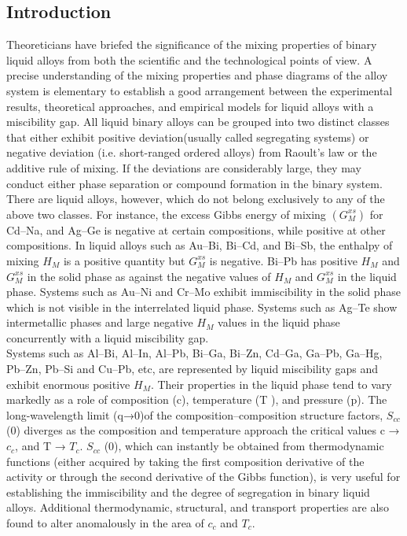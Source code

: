 \documentclass[12pt]{article}
\newcommand*{\1}{\hspace{1pt}}
\begin{document}
    \subsection*{Introduction}
    Theoreticians have briefed the significance of the mixing properties of binary liquid alloys 
    from both the scientific and the technological points of view. A precise understanding of 
    the mixing properties and phase diagrams of the alloy system is elementary to establish a 
    good arrangement between the experimental results, theoretical approaches, and empirical 
    models for liquid alloys with a miscibility gap.
    All liquid binary alloys can be grouped into two distinct classes that either exhibit 
    positive deviation(usually called segregating systems) or negative deviation (i.e. 
    short-ranged ordered alloys) from Raoult's law or the additive rule of mixing. If the 
    deviations are considerably large, they may conduct either phase separation or compound 
    formation in the binary system. \\

        There are liquid alloys, however, which do not belong exclusively to any of the above 
    two classes. For instance, the excess Gibbs energy of mixing $(G ^{xs} _{M} )$ for Cd–Na, and 
    Ag–Ge is negative at certain compositions, while positive at other compositions. In 
    liquid alloys such as Au–Bi, Bi–Cd, and Bi–Sb, the enthalpy of mixing $H_{M}$ is a 
    positive quantity but $G^{xs} _{M}$  is negative. Bi–Pb has positive $H_{M}$ and $G^{xs}_{M} $ in the 
    solid phase as against the negative values of $H_{M}$ and $G^{xs} _{M}$ in the liquid phase. 
    Systems such as Au–Ni and Cr–Mo exhibit immiscibility in the solid phase which is not 
    visible in the interrelated liquid phase. Systems such as Ag–Te show intermetallic 
    phases and large negative $H_{M}$ values in the liquid phase concurrently with a liquid 
    miscibility gap. \\

    
        Systems such as Al–Bi, Al–In, Al–Pb, Bi–Ga, Bi–Zn, Cd–Ga, Ga–Pb, Ga–Hg, Pb–Zn, Pb–Si 
    and Cu–Pb, etc, are represented by liquid miscibility gaps and exhibit enormous positive 
    $H_{M}$. Their properties in the liquid phase tend to vary markedly as a role of composition (c),
    temperature (T ), and pressure (p). The long-wavelength limit (q→0)of the 
    composition–composition structure factors, $S_{cc}$ (0) diverges as the composition and 
    temperature approach the critical values c → $c_{c}$, and T → $T_{c}$. $S_{cc}$ (0), which can instantly
    be obtained from thermodynamic functions (either acquired by taking the first composition 
    derivative of the activity or through the second derivative of the Gibbs function), is 
    very useful for establishing the immiscibility and the degree of segregation in binary 
    liquid alloys. Additional thermodynamic, structural, and transport properties are also 
    found to alter anomalously in the area of $c_{c}$ and $T_{c}$. \\ 
\end{document}
